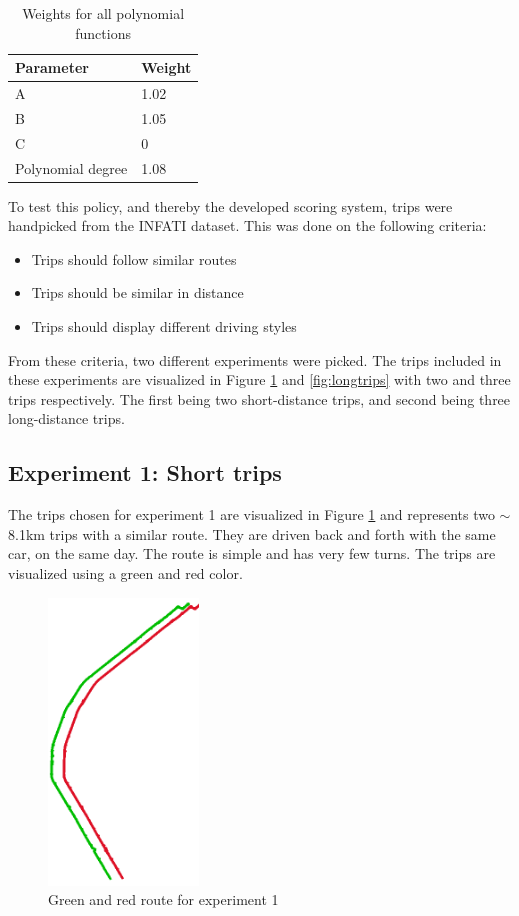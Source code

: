 \begin{table}
    \centering
    \begin{tabular}{ll}
    \textbf{Parameter} & \textbf{Weight} \\ \hline
    A                  & 1.02            \\
    B                  & 1.05            \\
    C                  & 0               \\
    Polynomial degree  & 1.08            \\ \hline
    \end{tabular}
    \caption{Weights for all polynomial functions}
    \label{tab:polyvalues}
\end{table}

To test this policy, and thereby the developed scoring system, trips were handpicked from the INFATI dataset\cite{art:INFATI}. This was done on the following criteria:

\begin{itemize}
  \item Trips should follow similar routes
  \item Trips should be similar in distance
  \item Trips should display different driving styles
\end{itemize}

From these criteria, two different experiments were picked. The trips included in these experiments are visualized in Figure \ref{fig:shorttrips} and \ref{fig:longtrips} with two and three trips respectively. The first being two short-distance trips, and second being three long-distance trips.

\subsection{Experiment 1: Short trips} \label{subsec:expe1}
The trips chosen for experiment 1 are visualized in Figure \ref{fig:shorttrips} and represents two $\sim$8.1km trips with a similar route. They are driven back and forth with the same car, on the same day. The route is simple and has very few turns. The trips are visualized using a green and red color.

\begin{figure}[tb]
    \centering
    \includegraphics[width=40mm]{Pictures/ShortTrips.png}
    \caption{Green and red route for experiment 1}
    \label{fig:shorttrips}
\end{figure}

